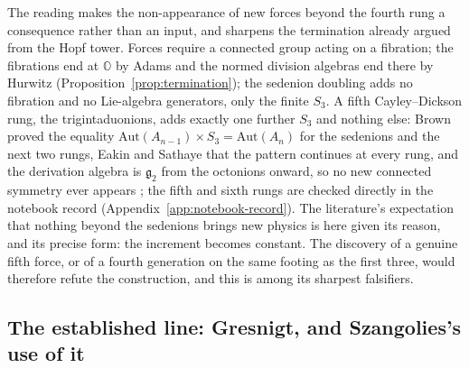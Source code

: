 \begin{remark}
\label{rem:no-fifth-force}
The reading makes the non-appearance of new forces beyond the fourth rung a consequence rather than
an input, and sharpens the termination already argued from the Hopf tower. Forces require a connected
group acting on a fibration; the fibrations end at $\mathbb{O}$ by Adams and the normed division
algebras end there by Hurwitz (Proposition~\ref{prop:termination}); the sedenion doubling adds no
fibration and no Lie-algebra generators, only the finite $S_3$. A fifth Cayley--Dickson rung, the
trigintaduonions, adds exactly one further $S_3$ and nothing else: Brown proved the equality
$\mathrm{Aut}(A_{n-1})\times S_3 = \mathrm{Aut}(A_n)$ for the sedenions and the next two rungs,
Eakin and Sathaye that the pattern continues at every rung, and the derivation algebra is
$\mathfrak{g}_2$ from the octonions onward, so no new connected symmetry ever appears
\autocite{brown1967generalized,eakinsathaye1990automorphisms,schafer1954cayleydickson}; the fifth
and sixth rungs are checked directly in the notebook record (Appendix~\ref{app:notebook-record}).
The literature's expectation that nothing beyond the sedenions brings new physics is here given its
reason, and its precise form: the increment becomes constant. The discovery of a genuine fifth force, or of a fourth
generation on the same footing as the first three, would therefore refute the construction, and this
is among its sharpest falsifiers.
\end{remark}

\subsection{The established line: Gresnigt, and Szangolies's use of it}
\label{sec:sedenions-literature}

